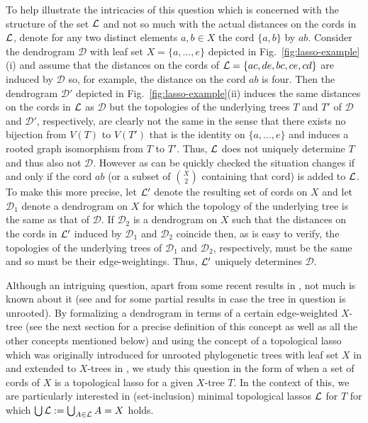 To help illustrate the intricacies of this question which is concerned
with the structure of the set ${\mathcal L}$ and not so much with 
the actual distances on the cords in ${\mathcal L}$,
denote for any two distinct elements $a,b\in X$ the cord $\{a,b\}$
by $ab$. Consider the dendrogram $\mathcal D$ with leaf set
$X=\{a,\ldots, e\}$ depicted in
Fig.~\ref{fig:lasso-example}(i) and assume
 that the distances on the cords of ${\mathcal L}=\{ac,de,bc,ce,cd\}$
are induced by $\mathcal D$ so, for example, the distance 
on the cord $ab$ 
is four. Then the dendrogram $\mathcal D'$
depicted in Fig.~\ref{fig:lasso-example}(ii) induces the
same distances on the cords in ${\mathcal L}$ as $\mathcal D$
but the topologies of the underlying trees $T$ and $T'$
of $\mathcal D$ and $\mathcal D'$, respectively, 
are clearly not the same in the sense that there exists no
bijection from $V(T)$ to $V(T')$ that is the
identity on $\{a,\ldots, e\}$ and induces a  rooted graph 
isomorphism from  $T$ to $T'$.
Thus, ${\mathcal L}$ does
not uniquely determine $T$ and thus also not $\mathcal D$. However
as can be quickly checked the situation changes if and only if
the cord $ab$ (or a subset of ${X\choose 2}$ containing that cord)
is added to ${\mathcal L}$.  To make this more precise, 
let ${\mathcal L}'$ denote the resulting set of cords on $X$
and let $\mathcal D_1$ denote a dendrogram on $X$ for which the
topology of the underlying tree 
is the same as that of $\mathcal D$. If $\mathcal D_2$ is a dendrogram
on $X$  such that the distances on the
cords in ${\mathcal L}'$ induced by $\mathcal D_1$ and $\mathcal D_2$ coincide then,
as is easy to verify, the topologies of the 
underlying trees of $\mathcal D_1$ and $\mathcal D_2$,  
respectively, must be the same 
and so must be their edge-weightings. Thus, ${\mathcal L}'$
uniquely determines $\mathcal D$. 

Although an intriguing question, apart  from some recent results in \cite{HP13},
not much is known about it (see \cite{DHS11} and \cite{HS13}
for some partial results in case the tree in question is unrooted).
By formalizing a dendrogram in terms of a certain  edge-weighted
$X$-tree (see the next section for a precise definition
of this concept as well as all the other concepts
mentioned below) and using the concept of a
topological lasso which was originally introduced 
for unrooted phylogenetic trees with leaf set $X$
in \cite{DHS11} 
and extended to $X$-trees in \cite {HP13}, we study this question in
the form of when a set of cords of $X$  is a topological
lasso for a given $X$-tree $T$. In the context of this,
we are particularly interested in (set-inclusion) minimal topological
lassos ${\mathcal L}$ for $T$ for which $
\bigcup {\mathcal L}:=\bigcup_{A\in{\mathcal L}} A=X$ holds. 

